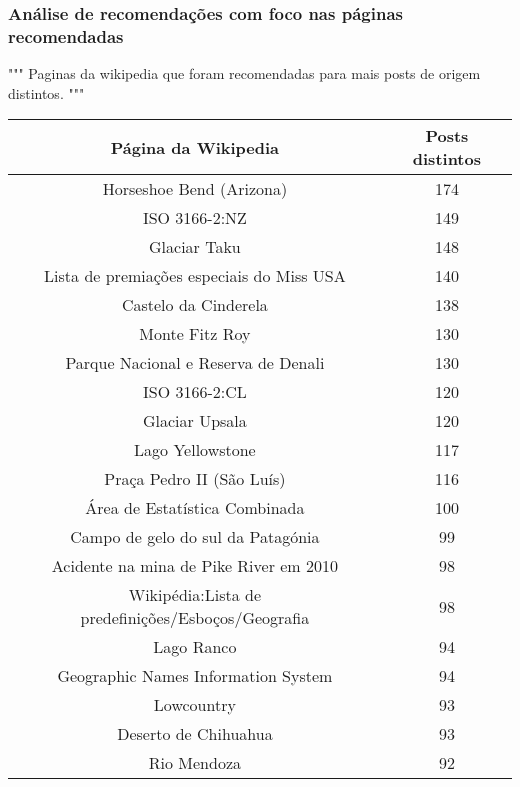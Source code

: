 \subsubsection{Análise de recomendações com foco nas páginas recomendadas}

"""
Paginas da wikipedia que foram recomendadas para mais posts de origem distintos.
"""

\begin{center}
    \begin{tabular}{|c|c|}
        \hline
        \textbf{Página da Wikipedia} & \textbf{Posts distintos} \\
        \hline
        Horseshoe Bend (Arizona) & 174 \\
        \hline
        ISO 3166-2:NZ & 149 \\
        \hline
        Glaciar Taku & 148 \\
        \hline
        Lista de premiações especiais do Miss USA & 140 \\
        \hline
        Castelo da Cinderela & 138 \\
        \hline
        Monte Fitz Roy & 130 \\
        \hline
        Parque Nacional e Reserva de Denali & 130 \\
        \hline
        ISO 3166-2:CL & 120 \\
        \hline
        Glaciar Upsala & 120 \\
        \hline
        Lago Yellowstone & 117 \\
        \hline
        Praça Pedro II (São Luís) & 116 \\
        \hline
        Área de Estatística Combinada & 100 \\
        \hline
        Campo de gelo do sul da Patagónia & 99 \\
        \hline
        Acidente na mina de Pike River em 2010 & 98 \\
        \hline
        Wikipédia:Lista de predefinições/Esboços/Geografia & 98 \\
        \hline
        Lago Ranco & 94 \\
        \hline
        Geographic Names Information System & 94 \\
        \hline
        Lowcountry & 93 \\
        \hline
        Deserto de Chihuahua & 93 \\
        \hline
        Rio Mendoza & 92 \\
        \hline
    \end{tabular}
\end{center}

